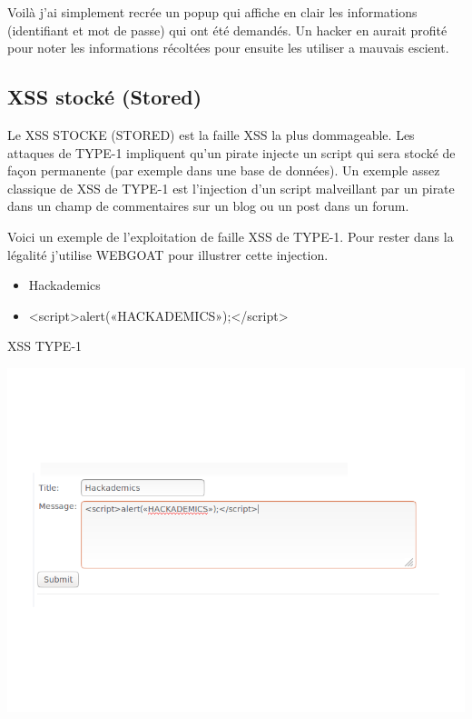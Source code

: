 \begin{flushleft}
Voilà j'ai simplement recrée un popup qui affiche en clair les informations (identifiant et mot de passe) qui ont été demandés. Un hacker en aurait profité pour noter les informations récoltées pour ensuite les utiliser a mauvais escient.
\end{flushleft}

\subsection{XSS stocké (Stored)}\label{vulnerabilites:web:xss:stored}

Le XSS STOCKE (STORED) est la faille XSS la plus dommageable. Les attaques de TYPE-1 impliquent qu'un pirate injecte un script qui sera stocké de façon permanente (par exemple dans une base de données). Un exemple assez classique de XSS de TYPE-1 est l'injection d'un script malveillant par un pirate dans un champ de commentaires sur un blog ou un post dans un forum.

\begin{flushleft}
Voici un exemple de l'exploitation de faille XSS de TYPE-1. Pour rester dans la légalité j'utilise WEBGOAT pour illustrer cette injection.
\end{flushleft}

\bigskip

\begin{itemize}
\item Hackademics
\item <script>alert(«HACKADEMICS»);</script>
\end{itemize}

\bigskip


\begin{center}
\caption{XSS TYPE-1}
\includegraphics[scale=0.3]{Web/assets/xsst1-0.png}
\end{center}


